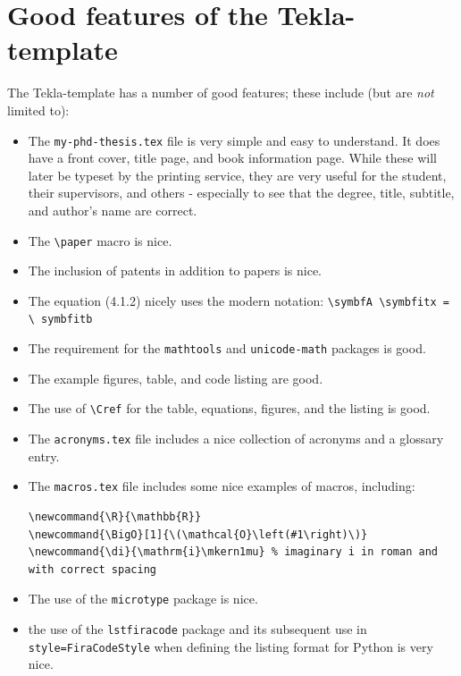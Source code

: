 \documentclass[12pt, twoside]{article}
\newcommand{\fname}[1]{\texttt{#1}}
\begin{document}
\section{Good features of the Tekla-template}
The Tekla-template has a number of good features; these include (but are \textit{not} limited to):
\begin{itemize}[label=\color{green}]
\item The \fname{my-phd-thesis.tex} file is very simple and easy to understand. It
does have a front cover, title page, and book information page. While these will
later be typeset by the printing service, they are very useful for the
student, their supervisors, and others - especially to see that the degree, title, subtitle, and author's name are correct.

\item The \texttt{\textbackslash paper} macro is nice.

\item The inclusion of patents in addition to papers is nice.

\item The equation (4.1.2) nicely uses the modern notation: 
\texttt{\textbackslash symbf{A} \textbackslash symbfit{x} = \textbackslash
  symbfit{b}}

\item The requirement for the \texttt{mathtools} and \texttt{unicode-math} packages is good.

\item The example figures, table, and code listing are good.

\item The use of \texttt{\textbackslash Cref} for the table, equations, figures, and the listing is good.

\item The \fname{acronyms.tex} file includes a nice collection of acronyms and a glossary entry.

\item The \fname{macros.tex} file includes some nice examples of macros, including:
\begin{lstlisting}[style=latexExample, caption={Examples macros from macros.tex}, columns=fullflexible, showstringspaces=false, label=lst:examplemacro]
\newcommand{\R}{\mathbb{R}}
\newcommand{\BigO}[1]{\(\mathcal{O}\left(#1\right)\)}
\newcommand{\di}{\mathrm{i}\mkern1mu} % imaginary i in roman and with correct spacing
\end{lstlisting}

\item The use of the \texttt{microtype} package is nice.

\item the use of the \texttt{lstfiracode} package and its subsequent use in \texttt{style=FiraCodeStyle} when defining the listing format for Python is very nice.
\end{itemize}
\end{document}
